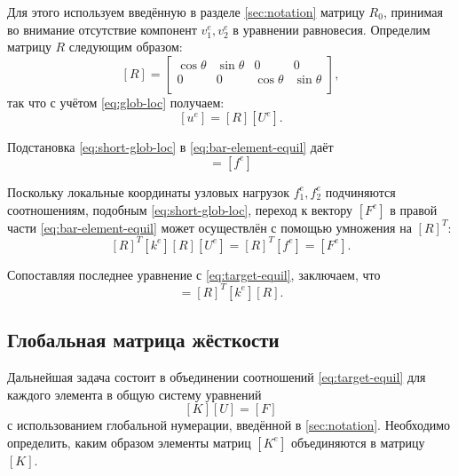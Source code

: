 \documentclass[10pt]{article}
\numberwithin{equation}{section}
\newcommand{\matr}[1]{[#1]}
\begin{document}
Для этого используем введённую в разделе \ref{sec:notation} матрицу
$R_0$, принимая во внимание отсутствие компонент $v_1^e, v_2^e$ в
уравнении равновесия. Определим матрицу $R$ следующим образом:
\begin{equation}
  \label{eq:short-rotmatrix}
  \matr{R} =
  \begin{bmatrix}
    \cos\theta & \sin\theta & 0 & 0 \\
    0 & 0 & \cos\theta & \sin\theta \\
  \end{bmatrix},
\end{equation}
так что с учётом \eqref{eq:glob-loc} получаем:
\begin{equation}
  \label{eq:short-glob-loc}
  \matr{u^e} = \matr{R}\matr{U^e}.
\end{equation}

Подстановка \eqref{eq:short-glob-loc} в \eqref{eq:bar-element-equil} даёт
\begin{equation*}
  \matr{k^e}\matr{R}\matr{U^e}=\matr{f^e}
\end{equation*}

Поскольку локальные координаты узловых нагрузок $f_1^e, f_2^e$
подчиняются соотношениям, подобным \eqref{eq:short-glob-loc}, переход
к вектору $\matr{F^e}$ в правой части \eqref{eq:bar-element-equil}
может осуществлён с помощью умножения на $\matr{R}^T$:
\begin{equation}
  \label{eq:bar-global-equil}
  \matr{R}^T\matr{k^e}\matr{R}\matr{U^e}=\matr{R}^T\matr{f^e} = \matr{F^e}.
\end{equation}

Сопоставляя последнее уравнение с \eqref{eq:target-equil}, заключаем,
что
\begin{equation*}
  \matr{K^e} = \matr{R}^T\matr{k^e}\matr{R}.
\end{equation*}

\subsection{Глобальная матрица жёсткости}

Дальнейшая задача состоит в объединении соотношений
\eqref{eq:target-equil} для каждого элемента в общую систему уравнений
\begin{equation}
  \label{eq:general-system}
  \matr{K}\matr{U}=\matr{F}
\end{equation}
с использованием глобальной нумерации, введённой в \ref{sec:notation}.
Необходимо определить, каким образом элементы матриц $\matr{K^e}$
объединяются в матрицу $\matr{K}$.
\end{document}

